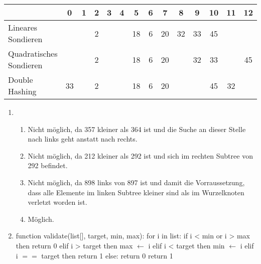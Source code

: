 \documentclass[a4paper, 12pt, margins=2.5cm]{homework}
\begin{document}
  \begin{problem}
    
  \end{problem}
  \begin{solution} \hfill
    \begin{center}
      \begin{tabular}{l||c|c|c|c|c|c|c|c|c|c|c|c|c}
                                & 0  & 1 & 2 & 3 & 4 & 5  & 6 & 7  & 8  & 9  & 10 & 11 & 12 \\ \hline \hline
        Lineares Sondieren      &    &   & 2 &   &   & 18 & 6 & 20 & 32 & 33 & 45 &    &    \\ \hline
        Quadratisches Sondieren &    &   & 2 &   &   & 18 & 6 & 20 &    & 32 & 33 &    & 45 \\ \hline
        Double Hashing          & 33 &   & 2 &   &   & 18 & 6 & 20 &    &    & 45 & 32 &   
      \end{tabular}
    \end{center}
  \end{solution}


  \begin{problem}
    
  \end{problem}
  \begin{solution}\hfill
    \begin{enumerate}[label=(\alph*)]\itemsep0pt
      \item
        \begin{enumerate}[label=(\arabic*)]\itemsep0pt
          \item Nicht möglich, da 357 kleiner als 364 ist und die Suche an dieser
                Stelle nach links geht anstatt nach rechts.
          \item Nicht möglich, da 212 kleiner als 292 ist und sich im rechten Subtree
                von 292 befindet.
          \item Nicht möglich, da 898 links von 897 ist und damit die Vorraussetzung,
                dass alle Elemente im linken Subtree kleiner sind als im Wurzelknoten
                verletzt worden ist.
          \item Möglich.
        \end{enumerate} 

      \item \hfill

        \begin{algorithm}[mathescape]
function validate(list[], target, min, max):
  for i in list:
    if i < min or i > max then
      return 0
    elif i > target then
      max $\gets$ i
    elif i < target then
      min $\gets$ i
    elif i $==$ target then
      return 1
    else:
      return 0
  return 1
\end{algorithm}
    \end{enumerate}
  \end{solution}
\end{document}
